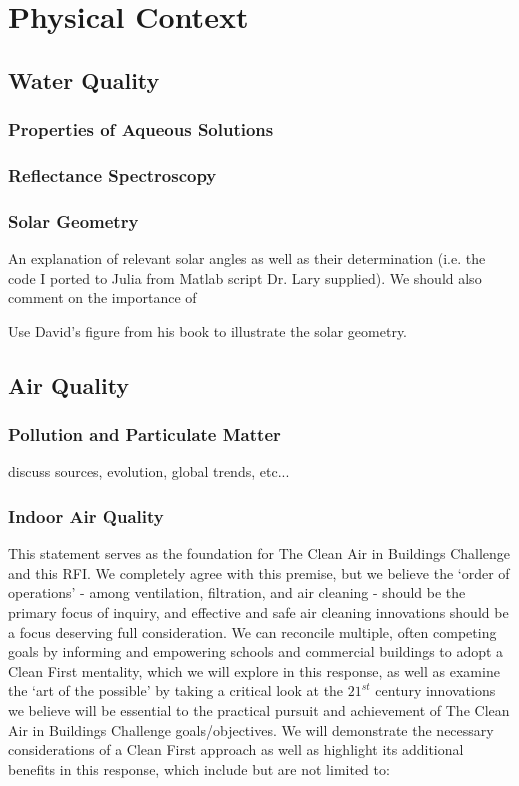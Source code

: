 \chapter{Physical Context}


\section{Water Quality}

\subsection{Properties of Aqueous Solutions}
\subsection{Reflectance Spectroscopy}
\subsection{Solar Geometry}

An explanation of relevant solar angles as well as their determination (i.e. the code I ported to Julia from Matlab script Dr. Lary supplied). We should also comment on the importance of

Use David's figure from his book to illustrate the solar geometry.



\section{Air Quality}
\subsection{Pollution and Particulate Matter}
discuss sources, evolution, global trends, etc...

\subsection{Indoor Air Quality}

This statement serves as the foundation for The Clean Air in Buildings Challenge and this RFI. We completely agree with this premise, but we believe the ‘order of operations’ - among ventilation, filtration, and air cleaning - should be the primary focus of inquiry, and effective and safe air cleaning innovations should be a focus deserving full consideration. We can reconcile multiple, often competing goals by informing and empowering schools and commercial buildings to adopt a  Clean First mentality, which we will explore in this response, as well as examine the ‘art of the possible’ by taking a critical look at the $21^{st}$ century innovations we believe will be essential to the practical pursuit and achievement of The Clean Air in Buildings Challenge goals/objectives. We will demonstrate the necessary considerations of a Clean First approach as well as highlight its additional benefits in this response, which include but are not limited to:


